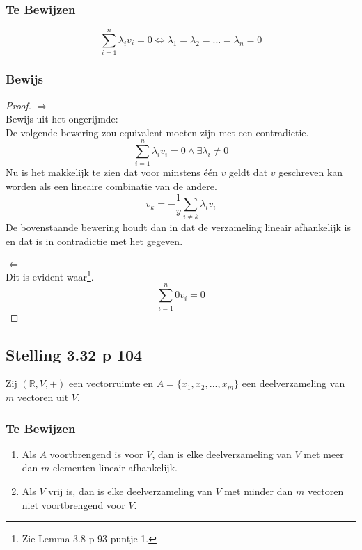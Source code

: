 \documentclass[lineaire_algebra_oplossingen.tex]{subfiles}
\begin{document}
\subsubsection*{Te Bewijzen}
\[
\sum_{i=1}^n\lambda_iv_i=0 \Leftrightarrow \lambda_1 = \lambda_2 = ... = \lambda_n = 0
\]
\subsubsection*{Bewijs}
\begin{proof}
\emph{$\Rightarrow$}\\
Bewijs uit het ongerijmde:\\
De volgende bewering zou equivalent moeten zijn met een contradictie.
\[
\sum_{i=1}^n\lambda_iv_i=0 \wedge \exists \lambda_i \neq 0
\]
Nu is het makkelijk te zien dat voor minstens \'e\'en $v$ geldt dat $v$ geschreven kan worden als een lineaire combinatie van de andere.
\[
v_k = -\frac{1}{y}\sum_{i\neq k}\lambda_iv_i
\]
De bovenstaande bewering houdt dan in dat de verzameling lineair afhankelijk is en dat is in contradictie met het gegeven.
\\\\
\emph{$\Leftarrow$}\\
Dit is evident waar\footnote{Zie Lemma 3.8 p 93 puntje 1.}.
\[
\sum_{i=1}^n0v_i=0
\]
\end{proof}

\subsection{Stelling 3.32 p 104}
Zij $(\mathbb{R},V,+)$ een vectorruimte en $A = \{x_1,x_2,...,x_m\}$ een deelverzameling van $m$ vectoren uit $V$.
\subsubsection*{Te Bewijzen}
\begin{enumerate}
\item
Als $A$ voortbrengend is voor $V$, dan is elke deelverzameling van $V$ met meer dan $m$ elementen lineair afhankelijk.
\item
Als $V$ vrij is, dan is elke deelverzameling van $V$ met minder dan $m$ vectoren niet voortbrengend voor $V$.
\end{enumerate}
\end{document}
